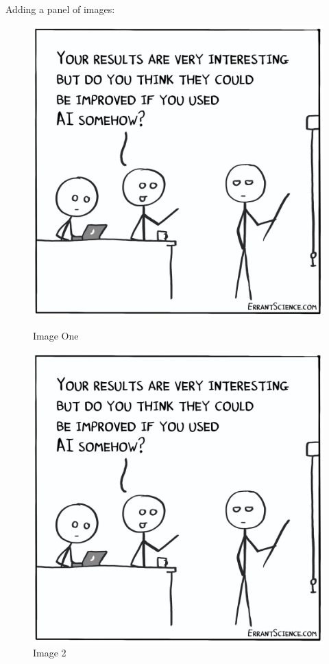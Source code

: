 Adding a panel of images:
\begin{figure}[ht]
    \begin{minipage}[b]{0.48\textwidth}
        \centering
        \includegraphics[width=\textwidth]{images/ai-results-improve.jpeg}
        \caption{Image One}
        \label{fig:image-one}
    \end{minipage}
    \begin{minipage}[b]{0.48\textwidth}
        \centering
        \includegraphics[width=\textwidth]{images/ai-results-improve.jpeg}
        \caption{Image 2}
        \label{fig:image-two}
    \end{minipage}
\end{figure}
